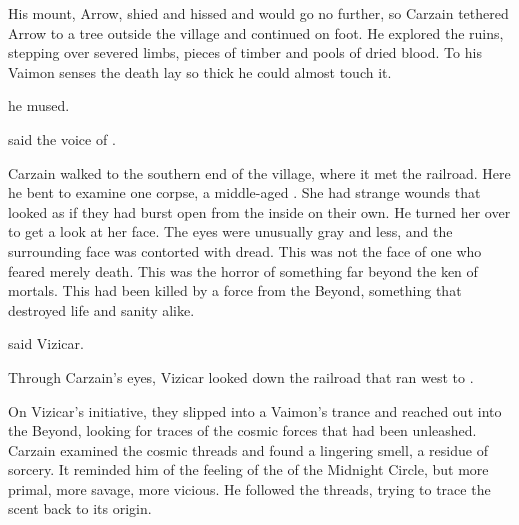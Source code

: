 His \relc mount, Arrow, shied and hissed and would go no further, so Carzain tethered Arrow to a tree outside the village and continued on foot. 
He explored the ruins, stepping over severed limbs, pieces of timber and pools of dried blood. 
To his Vaimon senses the death lay so thick he could almost touch it. 

 he mused. 

 said the voice of \VizicarDurasRespina. 

Carzain walked to the southern end of the village, where it met the railroad.
Here he bent to examine one corpse, a middle-aged \sphyle. 
She had strange wounds that looked as if they had burst open from the inside on their own. 
He turned her over to get a look at her face. 
The eyes were unusually gray and \colour{}less, and the surrounding face was contorted with dread. 
This was not the face of one who feared merely death. 
This was the horror of something far beyond the ken of mortals. 
This \scatha had been killed by a force from the Beyond, something that destroyed life and sanity alike. 

 said Vizicar. 


Through Carzain's eyes, Vizicar looked down the railroad that ran west to \Forclin. 



On Vizicar's initiative, they slipped into a Vaimon's \shechinah trance and reached out into the Beyond, looking for traces of the cosmic forces that had been unleashed. 
Carzain examined the cosmic threads and found a lingering smell, a residue of sorcery. 
It reminded him of the feeling of the \qliphoth{} of the Midnight Circle, but more primal, more savage, more vicious. 
He followed the threads, trying to trace the scent back to its origin. 

